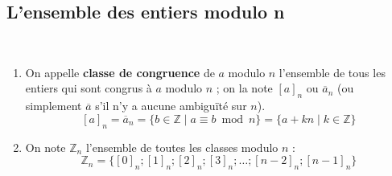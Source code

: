 %
%
\subsection{L’ensemble des entiers modulo n}

\begin{definition}
\ \vspace{-0.5cm}
\begin{enumerate}
	\item On appelle \textbf{classe de congruence} de $a$ modulo $n$ l'ensemble de tous les entiers qui sont congrus à $a$ modulo $n$ ; on la note $[a]_n$ ou $\overline{a}_n$ (ou simplement $\overline{a}$ s'il n'y a aucune ambiguïté sur $n$).
	$$[a]_n = \overline{a}_n = \{b \in \mathbb{Z} \mid a \equiv b \bmod n\} = \{a + kn \mid k \in \mathbb{Z}\}$$
	
	\item On note $\mathbb{Z}_n$ l'ensemble de toutes les classes modulo $n$ :
	$$\mathbb{Z}_n = \{[0]_n; [1]_n; [2]_n; [3]_n; \dots; [n-2]_n; [n-1]_n\}$$
\end{enumerate}

\end{definition}

